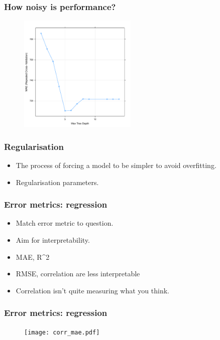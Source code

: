 \documentclass[handout, aspectratio = 169]{beamer}
\begin{document}
\begin{frame}
\frametitle{How noisy is performance?}
\vspace{-4mm}
\begin{figure}
    \includegraphics[width = 0.5\textwidth]{rpart_perf.pdf}
\end{figure} 
\end{frame} 


\begin{frame}
\frametitle{Regularisation}

\begin{itemize}
\item The process of forcing a model to be simpler to avoid overfitting.
\item Regularisation parameters.
\end{itemize}
\end{frame} 


\begin{frame}
\frametitle{Error metrics: regression}

\begin{itemize}
\item Match error metric to question.
\item Aim for interpretability.
\item MAE, R^2
\item RMSE, correlation are less interpretable
\item Correlation isn't quite measuring what you think.
\end{itemize}
\end{frame} 


\begin{frame}
\frametitle{Error metrics: regression}
\begin{figure}
    \texttt{[image: corr\_mae.pdf]}
\end{figure} 

\end{frame} 
\end{document}
